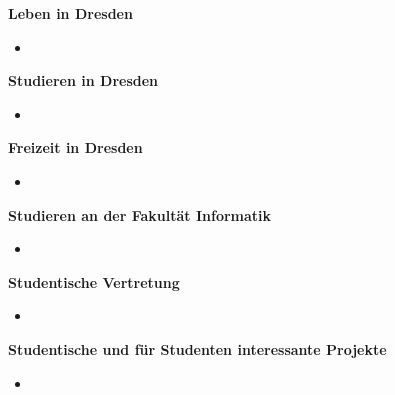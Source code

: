 

\textbf{Leben in Dresden}
\begin{itemize}
\item
\end{itemize}

\textbf{Studieren in Dresden}
\begin{itemize}
\item
\end{itemize}

\textbf{Freizeit in Dresden}
\begin{itemize}
\item
\end{itemize}

\textbf{Studieren an der Fakultät Informatik}
\begin{itemize}
\item
\end{itemize}

\textbf{Studentische Vertretung}
\begin{itemize}
\item
\end{itemize}

\textbf{Studentische und für Studenten interessante Projekte}
\begin{itemize}
\item
\end{itemize}
